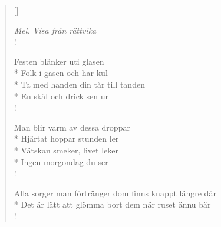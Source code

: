 \settowidth{\versewidth}{Festen blänker uti glasen}



\begin{verse}[\versewidth]

\flagverse{}
\emph{Mel. Visa från rättvika}\\!



Festen blänker uti glasen\\*
Folk i gasen och har kul\\*
Ta med handen din tår till tanden\\*
En skål och drick sen ur\\!


Man blir varm av dessa droppar\\*
Hjärtat hoppar stunden ler\\*
Vätskan smeker, livet leker\\*
Ingen morgondag du ser\\!

Alla sorger man förtränger dom finns knappt längre där\\*
Det är lätt att glömma bort dem när ruset ännu bär\\!





\end{verse}

